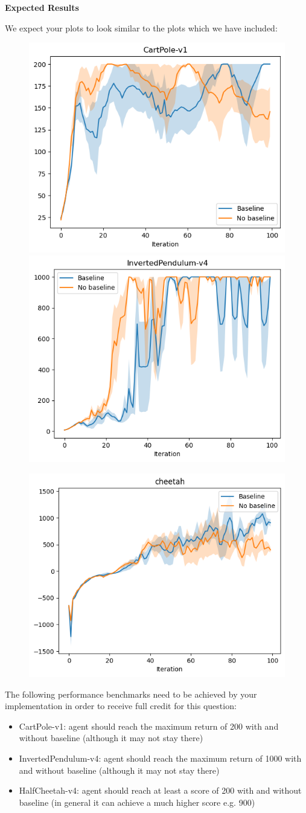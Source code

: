 \clearpage
\textbf{Expected Results}

We expect your plots to look similar to the plots which we have included:

\begin{figure}[H]
\centering
  \includegraphics[width=.45\linewidth]{images/CartPole-v1.png}
  \includegraphics[width=.45\linewidth]{images/InvertedPendulum-v4.png}
\end{figure}

\begin{figure}[H]
\centering
  \includegraphics[width=.45\linewidth]{images/HalfCheetah-v4.png}
\end{figure}

The following performance benchmarks need to be achieved by your implementation in order to receive full credit for this question:

\begin{itemize}
	\item CartPole-v1: agent should reach the maximum return of 200 with and without baseline (although it may not stay there)
	\item InvertedPendulum-v4: agent should reach the maximum return of 1000 with and without baseline (although it may not stay there)
	\item HalfCheetah-v4: agent should reach at least a score of 200 with and without baseline (in general it can achieve a much higher score e.g. 900)
\end{itemize}
\clearpage
